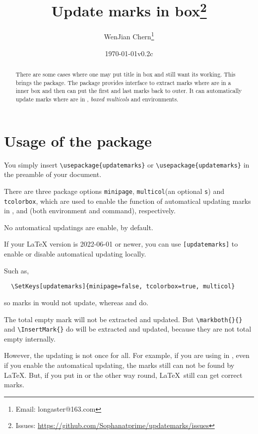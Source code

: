 \documentclass{l3doc}
\title{Update marks in box\thanks{Issues: \url{https://github.com/Sophanatprime/updatemarks/issues}}}
\author{WenJian Chern\thanks{Email: longaster@163.com}}
\date{\today\qquad v0.2c}
\begin{document}
\maketitle

\begin{abstract}
There are some cases where one may put title in box and still want its 
 working. This brings the  package.
The  package provides interface to extract marks where are in a 
inner box and then can put the first and last marks back to outer.
It can automatically update marks where are in , 
\textit{boxed multicols} and  environments.
\end{abstract}


\tableofcontents


\section{Usage of the package}

You simply insert \verb|\usepackage{updatemarks}| or 
\verb|\usepackage|\verb|{updatemarks}| in the preamble of your document.

There are three package options \texttt{minipage}, 
\texttt{multicol}(an optional \texttt s) and 
\texttt{tcolorbox}, which are used to enable the function of automatical updating marks
in ,  and 
 (both  environment and  command), respectively.

No automatical updatings are enable, by default.

If your {\LaTeX} version is 2022-06-01 or newer, you can use 
\texttt{[updatemarks]} to enable or disable
automatical updating locally.

Such as,
\begin{verbatim}
  \SetKeys[updatemarks]{minipage=false, tcolorbox=true, multicol}
\end{verbatim}
so marks in  would not update, 
whereas  and  do.

The total empty mark will not be extracted and updated.
But \verb|\markboth{}{}| and \verb|\InsertMark{}| do will be extracted and updated,
because they are not total empty internally.

However, the updating is not once for all.
For example, if you are using  in , even if you enable
the automatical updating, the marks still can not be found by \LaTeX.
But, if you put  in  or the other way round, 
\LaTeX\ still can get correct marks.
\end{document}
